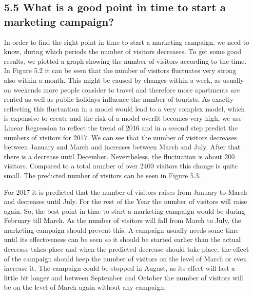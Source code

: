 \subsection{5.5	What is a good point in time to start a marketing campaign?}
In order to find the right point in time to start a marketing campaign, we need to know, during which periods the number of visitors decreases. To get some good results, we plotted a graph showing the number of visitors according to the time.
In Figure 5.2 it can be seen that the number of visitors fluctuates very strong also within a month. This might be caused by changes within a week, as usually on weekends more people consider to travel and therefore more apartments are rented as well as public holidays influence the number of tourists. As exactly reflecting this fluctuation in a model would lead to a very complex model, which is expensive to create and the risk of a model overfit becomes very high, we use Linear Regression to reflect the trend of 2016 and in a second step predict the numbers of visitors for 2017. We can see that the number of visitors decreases between January and March and increases between March and July. After that there is a decrease until December. Nevertheless, the fluctuation is about 200 visitors. Compared to a total number of over 2400 visitors this change is quite small.
The predicted number of visitors can be seen in Figure 5.3.

For 2017 it is predicted that the number of visitors raises from January to March and decreases until July. For the rest of the Year the number of visitors will raise again. So, the best point in time to start a marketing campaign would be during February till March. As the number of visitors will fall from March to July, the marketing campaign should prevent this. A campaign usually needs some time until its effectiveness can be seen so it should be started earlier than the actual decrease takes place and when the predicted decrease should take place, the effect of the campaign should keep the number of visitors on the level of March or even increase it. The campaign could be stopped in August, as its effect will last a little bit longer and between September and October the number of visitors will be on the level of March again without any campaign.


%
